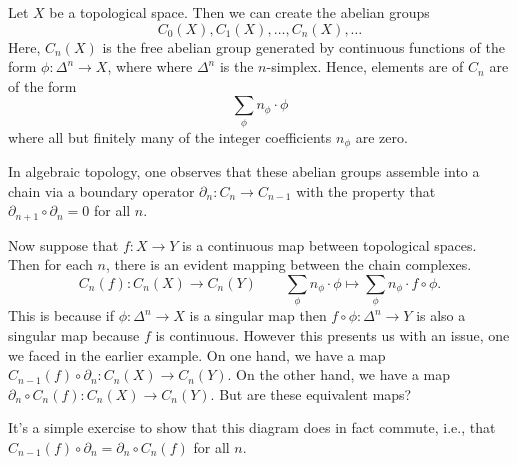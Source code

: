     \begin{example}
        Let $X$ be a topological space. Then we can create the abelian groups 
        \[
            C_0(X), C_1(X), \dots, C_n(X), \dots         
        \]
        Here, $C_n(X)$ is the free abelian 
        group generated by continuous functions of the form $\phi: \Delta^n \to X$, where 
        where $\Delta^n$ is the $n$-simplex. Hence, elements 
        are of $C_n$ are of the form 
        \[
            \sum_{\phi} n_{\phi} \cdot \phi       
        \]
        where all but finitely many of the integer coefficients $n_\phi$ 
        are zero. 
        
        In algebraic topology, one observes that these abelian groups assemble into a 
        chain via a boundary operator $\partial_n: C_n \to C_{n-1}$
        with the property that $\partial_{n+1}\circ\partial_n = 0$ for all $n$.
        \begin{center}
        \end{center} 
        Now suppose that $f: X \to Y$ is a continuous map between topological spaces.
        Then for each $n$, there is an evident mapping between the chain complexes.
        \[
            C_n(f): C_n(X) \to C_n(Y) \qquad \sum_{\phi} n_{\phi} \cdot \phi \mapsto \sum_{\phi} n_{\phi} \cdot f \circ \phi.
        \]
        This is because if $\phi: \Delta^n \to X$ is a singular map then $f \circ \phi: \Delta^n \to Y$ 
        is also a singular map because $f$ is continuous. 
        However this presents us with an issue, one we faced in the earlier example. 
        On one hand, we have a map $C_{n-1}(f) \circ \partial_n: C_n(X) \to C_n(Y)$. 
        On the other hand, we have a map $\partial_n \circ C_n(f): C_n(X) \to C_n(Y)$. 
        But are these equivalent maps? 
        \begin{center}
        \end{center}
        It's a simple exercise to show that this diagram does in fact commute, i.e., that 
        $C_{n-1}(f) \circ \partial_n = \partial_n \circ C_n(f)$ for all $n$. 


\end{example}
